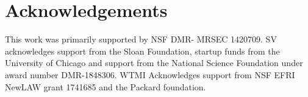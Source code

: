 \documentclass[
 preprint,
 preprintnumbers,
 amsmath,amssymb,
 aps,
 pre,
 longbibliography,
 superscriptaddress,
 10pt, twocolumn
]{revtex4-1}
\begin{document}



\section*{Acknowledgements}
This work was primarily supported by NSF DMR- MRSEC 1420709. SV acknowledges support from the Sloan Foundation, startup funds from the University of Chicago and support from the National Science Foundation under award number DMR-1848306. WTMI Acknowledges support from  NSF EFRI NewLAW grant 1741685 and the Packard foundation. 


\end{document}
